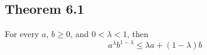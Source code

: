 \documentclass[../../main.tex]{subfiles}
\begin{document}
\subsection{Theorem 6.1}
\begin{wts}
For every $a$, $b\geq0$, and $0<\lambda<1$, then
\[
a^\lambda b^{1-\lambda}\leq\lambda a+(1-\lambda)b
\]
\end{wts}
\end{document}
